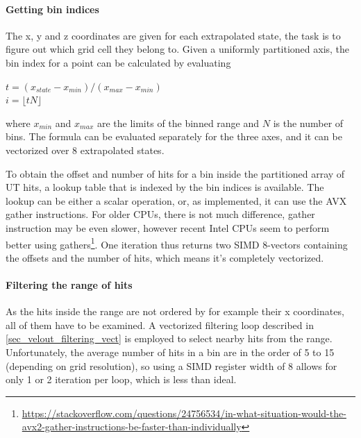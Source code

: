\documentclass[12pt]{article}
\begin{document}
\paragraph{Getting bin indices} \mbox{}\vspace{0.4pc}

The x, y and z coordinates are given for each extrapolated state, the task is to figure out which grid cell they belong to. Given a uniformly partitioned axis, the bin index for a point can be calculated by evaluating
\begin{center}
	$t = (x_{state} - x_{min})/(x_{max} - x_{min})$\\
	$i =  \lfloor t N \rfloor$	
\end{center}
where $x_{min}$ and $x_{max}$ are the limits of the binned range and $N$ is the number of bins. The formula can be evaluated separately for the three axes, and it can be vectorized over 8 extrapolated states.

To obtain the offset and number of hits for a bin inside the partitioned array of UT hits, a lookup table that is indexed by the bin indices is available. The lookup can be either a scalar operation, or, as implemented, it can use the AVX gather instructions. For older CPUs, there is not much difference, gather instruction may be even slower, however recent Intel CPUs seem to perform better using gathers\footnote{\href{https://stackoverflow.com/questions/24756534/in-what-situation-would-the-avx2-gather-instructions-be-faster-than-individually}{https://stackoverflow.com/questions/24756534/in-what-situation-would-the-avx2-gather-instructions-be-faster-than-individually}}. One iteration thus returns two SIMD 8-vectors containing the offsets and the number of hits, which means it's completely vectorized.


\paragraph{Filtering the range of hits} \mbox{}\vspace{0.4pc}

As the hits inside the range are not ordered by for example their x coordinates, all of them have to be examined. A vectorized filtering loop described in \ref{sec_velout_filtering_vect} is employed to select nearby hits from the range. Unfortunately, the average number of hits in a bin are in the order of 5 to 15 (depending on grid resolution), so using a SIMD register width of 8 allows for only 1 or 2 iteration per loop, which is less than ideal.
\end{document}
